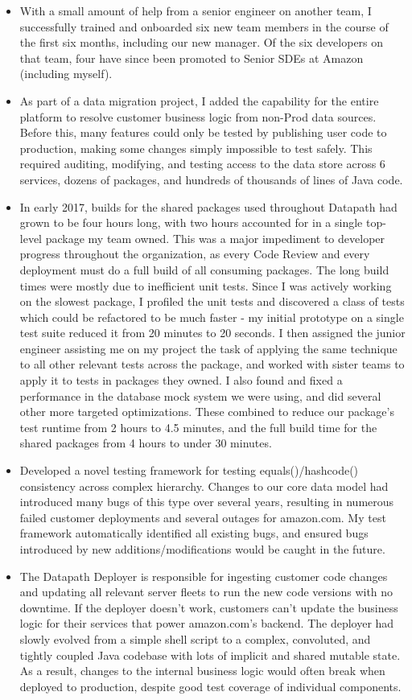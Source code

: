 \documentclass{res}
\begin{document}
\begin{resume}
\begin{itemize}
	\item With a small amount of help from a senior engineer on another team, I successfully trained and onboarded six new team members in the course of the first six months, including our new manager.  Of the six developers on that team, four have since been promoted to Senior SDEs at Amazon (including myself).
   \item As part of a data migration project, I added the capability for the entire platform to resolve customer business logic from non-Prod data sources.  Before this, many features could only be tested by publishing user code to production, making some changes simply impossible to test safely.  This required auditing, modifying, and testing access to the data store across 6 services, dozens of packages, and hundreds of thousands of lines of Java code.
   \item In early 2017, builds for the shared packages used throughout Datapath had grown to be four hours long, with two hours accounted for in a single top-level package my team owned.  This was a major impediment to developer progress throughout the organization, as every Code Review and every deployment must do a full build of all consuming packages.  The long build times were mostly due to inefficient unit tests.  Since I was actively working on the slowest package, I profiled the unit tests and discovered a class of tests which could be refactored to be much faster - my initial prototype on a single test suite reduced it from 20 minutes to 20 seconds.  I then assigned the junior engineer assisting me on my project the task of applying the same technique to all other relevant tests across the package, and worked with sister teams to apply it to tests in packages they owned.  I also found and fixed a performance in the database mock system we were using, and did several other more targeted optimizations. These combined to reduce our package’s test runtime from 2 hours to 4.5 minutes, and the full build time for the shared packages from 4 hours to under 30 minutes.
   \item Developed a novel testing framework for testing equals()/hashcode() consistency across complex hierarchy.  Changes to our core data model had introduced many bugs of this type over several years, resulting in numerous failed customer deployments and several outages for amazon.com.  My test framework automatically identified all existing bugs, and ensured bugs introduced by new additions/modifications would be caught in the future.
   \item The Datapath Deployer is responsible for ingesting customer code changes and updating all relevant server fleets to run the new code versions with no downtime.  If the deployer doesn’t work, customers can’t update the business logic for their services that power amazon.com’s backend.  The deployer had slowly evolved from a simple shell script to a complex, convoluted, and tightly coupled Java codebase with lots of implicit and shared mutable state.  As a result, changes to the internal business logic would often break when deployed to production, despite good test coverage of individual components.\\

\end{itemize}
\end{resume}
\end{document}
